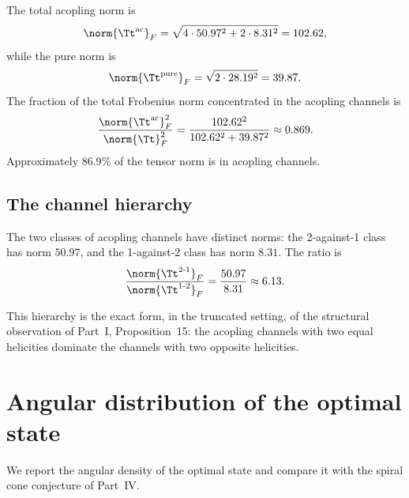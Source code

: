 \begin{remark}\label{part-5:rem:frac-ac-V}
The total acopling norm is
\begin{equation}\label{part-5:eq:norm-ac-V}
\norm{\Tt^{\mathrm{ac}}}_F = 
\sqrt{4\cdot 50.97^2 + 2\cdot 8.31^2} = 102.62,
\end{equation}
while the pure norm is
\begin{equation}\label{part-5:eq:norm-pure-V}
\norm{\Tt^{\mathrm{pure}}}_F = \sqrt{2\cdot 28.19^2} = 39.87.
\end{equation}
The fraction of the total Frobenius norm concentrated in the 
acopling channels is
\begin{equation}\label{part-5:eq:frac-ac-V}
\frac{\norm{\Tt^{\mathrm{ac}}}_F^2}{\norm{\Tt}_F^2} 
= \frac{102.62^2}{102.62^2+39.87^2} \approx 0.869.
\end{equation}
Approximately $86.9\%$ of the tensor norm is in acopling channels.
\end{remark}

\subsection{The channel hierarchy}
\label{part-5:ssec:hierarchy-numeric}

The two classes of acopling channels have distinct norms: the 
2-against-1 class has norm $50.97$, and the 1-against-2 class has 
norm $8.31$. The ratio is
\begin{equation}\label{part-5:eq:hierarchy-ratio-V}
\frac{\norm{\Tt^{2\text{-}1}}_F}{\norm{\Tt^{1\text{-}2}}_F} 
= \frac{50.97}{8.31} \approx 6.13.
\end{equation}

This hierarchy is the exact form, in the truncated setting, of the 
structural observation of Part~I, Proposition~15: the acopling 
channels with two equal helicities dominate the channels with two 
opposite helicities.

\section{Angular distribution of the optimal state}
\label{part-5:sec:angular-numeric}

We report the angular density of the optimal state and compare it 
with the spiral cone conjecture of Part~IV.

